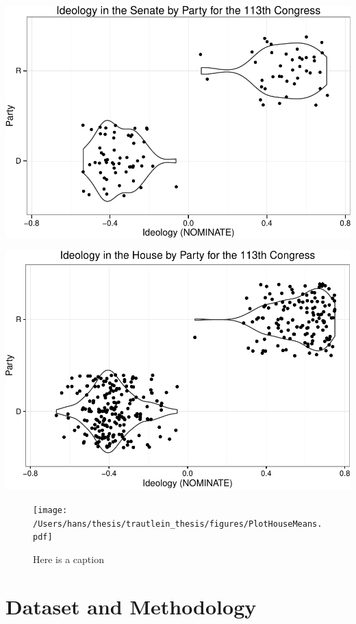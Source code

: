 \documentclass[12pt,twoside]{reedthesis}
\begin{document}
  \begin{center}\includegraphics{trautlein_thesis_files/figure-latex/violin_113_senate-1} \end{center}
  
  \begin{center}\includegraphics{trautlein_thesis_files/figure-latex/violin_113_house-1} \end{center}
  
  \begin{figure}[h!tbp]
  \centering
  \texttt{[image: /Users/hans/thesis/trautlein\_thesis/figures/PlotHouseMeans.pdf]}
  \caption[Here is a caption]{\normalsize{Here is a caption}}
  \label{fig:def}
  \end{figure}
  
  \chapter{Dataset and Methodology}\label{dataset-and-methodology}
  
\end{document}

